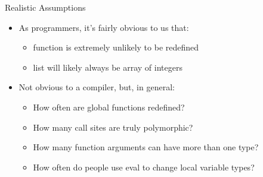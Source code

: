 \begin{frame}{Realistic Assumptions}
    \begin{itemize}
        \item As programmers, it's fairly obvious to us that:
        \begin{itemize}
            \item function  is extremely unlikely to be redefined
            \item list will likely always be array of integers
        \end{itemize}

        \item Not obvious to a compiler, but, in general:
        \begin{itemize}
            \item How often are global functions redefined?
            \item How many call sites are truly polymorphic?
            \item How many function arguments can have more than one type?
            \item How often do people use eval to change local variable types?
        \end{itemize}
    \end{itemize}
\end{frame}


